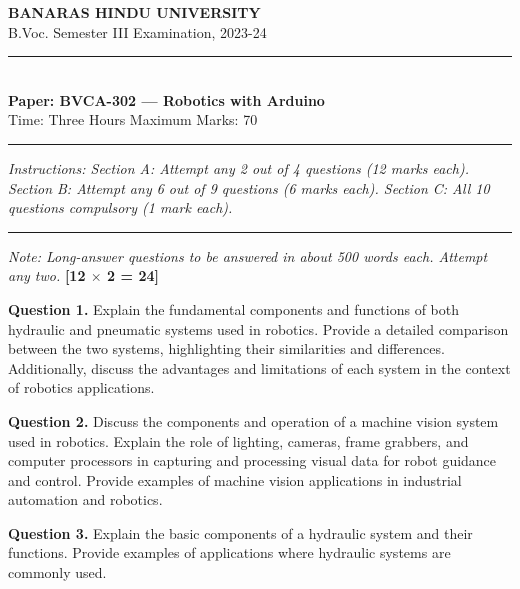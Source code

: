 \documentclass[11pt,a4paper]{article}
\begin{document}
\begin{center}
  {\large\bfseries BANARAS HINDU UNIVERSITY}\\[2pt]
  {
\normalsize B.Voc. Semester III Examination, 2023-24}\\[6pt]
  \rule{0.8\linewidth}{0.5pt}\\[6pt]
  {\large\bfseries Paper: BVCA-302 --- Robotics with Arduino}\\[4pt]
  {
\normalsize Time: Three Hours \hfill Maximum Marks: 70}
\end{center}

\rule{\linewidth}{0.4pt}

\smallskip



\noindent   \textit{Instructions: Section A: Attempt any 2 out of 4 questions (12 marks each). Section B: Attempt any 6 out of 9 questions (6 marks each). Section C: All 10 questions compulsory (1 mark each).}

\bigskip

\bigskip


\rule{\linewidth}{0.4pt}\smallskip




\noindent   \textit{Note: Long-answer questions to be answered in about 500 words each. Attempt any two.} \hfill   \textbf{[12 $ \times$ 2 = 24]}

\medskip


\noindent   \textbf{Question 1.} Explain the fundamental components and functions of both hydraulic and pneumatic systems used in robotics. Provide a detailed comparison between the two systems, highlighting their similarities and differences. Additionally, discuss the advantages and limitations of each system in the context of robotics applications.

\medskip


\noindent   \textbf{Question 2.} Discuss the components and operation of a machine vision system used in robotics. Explain the role of lighting, cameras, frame grabbers, and computer processors in capturing and processing visual data for robot guidance and control. Provide examples of machine vision applications in industrial automation and robotics.

\medskip


\noindent   \textbf{Question 3.} Explain the basic components of a hydraulic system and their functions. Provide examples of applications where hydraulic systems are commonly used.
\end{document}
